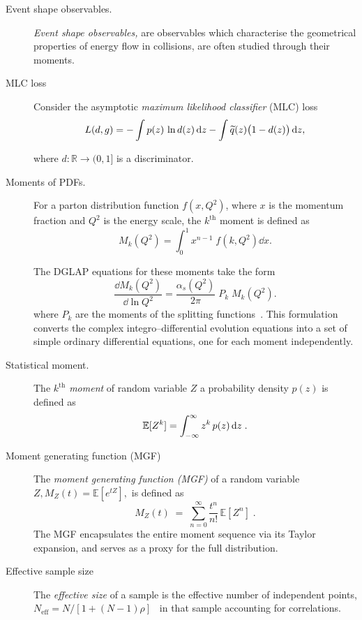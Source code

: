 \begin{description}
\item [Event shape observables.]
                \emph{Event shape observables,} are observables which characterise the geometrical properties of energy flow in collisions, are often studied through their moments.

\item [MLC loss]
 Consider the asymptotic \emph{maximum likelihood classifier} (MLC) loss
\begin{equation}
    L(d,g) = -\int p(z)\,\ln d(z)\,\dd z - \int \widetilde{q}(z)\big(1-d(z)\big)\,\dd z,
\end{equation}

where $d:\mathbb{R}\to(0,1]$ is a discriminator.

\item [Moments of PDFs.]
                For a parton distribution function $f(x,Q^2)$, where $x$ is the momentum fraction and $Q^2$ is the energy scale, the \(k^{\text{th}}\) moment is defined as
            \[
                M_k(Q^2) = \int_0^1 x^{n-1}\;f(k,Q^2) \dd x.
            \]
            
            The DGLAP equations for these moments take the form
            \[
            \frac{\dd M_k(Q^2)}{\dd \ln Q^2} = \frac{\alpha_s(Q^2)}{2\pi}\; P_k\;M_k(Q^2).
            \]
            where $P_k$ are the moments of the splitting functions~\cite{Ellis:1996mzs, salam_elements_2011, Schoeffel:1998tz, Strozik-Kotlorz:2014xga, Simonelli:2024vyh}.
            This formulation converts the complex integro--differential evolution equations into a set of simple ordinary differential equations, one for each moment independently.

\item [Statistical moment.]
        The \emph{$k^{\text{th}}$ moment} of random variable \(Z\) a probability density $p(z)$ is defined as
        \[
            \operatorname{\mathbb{E}} [Z^k] = \int_{-\infty}^{\infty} z^k\, p(z)\, \dd z\;.
        \]

\item 
            [Moment generating function (MGF)]
            The\emph{ moment generating function (MGF)} of a random variable \(Z, M_Z(t) = \mathbb{E}[e^{tZ}],\) is defined as
            \[
                M_Z(t) \;=\; \sum_{n=0}^\infty \frac{t^n}{n!}\,\mathbb{E}[Z^n]\;.
            \]
            The MGF encapsulates the entire moment sequence via its Taylor expansion, and serves as a proxy for the full distribution.

\item [Effective sample size]
    The \emph{effective size} of a sample is the effective number of independent points, $N_{\text{eff}} = N/[1+(N-1)\rho]$~\cite{thompson_power_2021, wang_power_2022, baumann_tutorial_2025, Yang2011EffectiveAnalyses} in that sample accounting for correlations.


\end{description}
